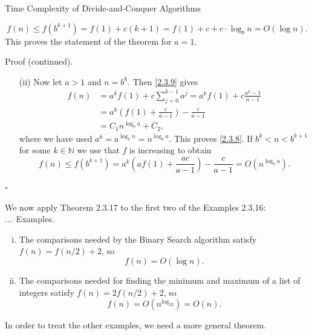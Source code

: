 \documentclass[smaller,hyperref={CJKbookmarks=true}]{beamer}
\newcommand{\N}{\mathbb{N}} \newcommand{\Z}{\mathbb{Z}} \newcommand{\Q}{\mathbb{Q}}
\newenvironment{PROOF}{{\noindent\!\sf\alert{Proof.}}\\}{\hfill$\square$\\}
\newcounter{zhuo}[subsection]
\renewcommand{\thezhuo}{\thesection.\thesubsection.\arabic{zhuo}}
\newenvironment{EXAMPLES}{\stepcounter{zhuo}\alert{\!\thezhuo.~Examples.\,}}{}
\begin{document}
\begin{frame}{Time Complexity of Divide-and-Conquer Algorithms}
\begin{PROOF}
\begin{spacing}{0.9}
\begin{itemize}
      \[f(n)\leq f(b^{k+1})=f(1)+c(k+1)=f(1)+c+c\cdot\log_bn=O(\log n).\]
      This proves the statement of the theorem for $a=1$.
\end{itemize}
\newpage
\alert{Proof (continued).}\\
\begin{itemize}
  \item[(ii)] Now let $a>1$ and $n=b^k$. Then \eqref{2.3.9} gives
      \begin{equation*}
        \begin{split}
           f(n) &=a^kf(1)+c\sum_{j=0}^{k-1}a^j=a^kf(1)+c\frac{a^k-1}{a-1} \\
             &=a^k\left(f(1)+\frac{c}{a-1}\right)-\frac{c}{a-1} \\
             &=C_1n^{\log_ba}+C_2,
        \end{split}
      \end{equation*}
      where we have used $a^k=a^{\log_bn}=n^{\log_ba}$. This proves \eqref{2.3.8}. If $b^k<n<b^{k+1}$ for some $k\in\N$ we use that $f$ is increasing to obtain
      \[f(n)\leq f(b^{k+1})=a^k\left(af(1)+\frac{ac}{a-1}\right)-\frac{c}{a-1}
      =O(n^{\log_ba}).\]
\end{itemize}
\end{spacing}
\end{PROOF}
\newpage
\begin{spacing}{1}
We now apply Theorem 2.3.17 to the first two of the Examples 2.3.16:\\[5pt]
\begin{EXAMPLES}
\begin{enumerate}[(i)]
  \item The comparisons needed by the Binary Search algorithm satisfy $f(n)=f(n/2)+2$, so
      \[f(n)=O(\log n).\]
  \item The comparisons needed for finding the minimum and maximum of a list of integers satisfy $f(n)=2f(n/2)+2$, so
      \[f(n)=O(n^{\log_22})=O(n).\]
\end{enumerate}
\vspace*{9pt}
In order to treat the other examples, we need a more general theorem.
\end{EXAMPLES}
\end{spacing}
\end{frame}
\end{document}
